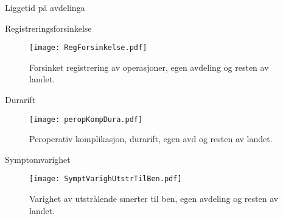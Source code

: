 \documentclass[handout, xcolor=pdftex,dvipsnames,table]{beamer}\usepackage[]{graphicx}\usepackage[]{color}
\begin{document}
\begin{tiny}
\begin{frame}[fragile] {Liggetid på avdelinga}
\end{frame}



\begin{frame}[fragile] {Registreringsforsinkelse}

\begin{figure}[ht]
\centering              
\texttt{[image: RegForsinkelse.pdf]}
\caption{Forsinket registrering av operasjoner, egen avdeling og resten av landet.}
\end{figure}

\end{frame}

\begin{frame}[fragile] {Durarift}
\begin{figure}[ht]
\centering              
\texttt{[image: peropKompDura.pdf]}
\caption{Peroperativ komplikasjon, durarift, egen avd og resten av landet.}
\end{figure}
\end{frame}

\begin{frame}[fragile] {Symptomvarighet}
\begin{figure}[ht]
\centering              
\texttt{[image: SymptVarighUtstrTilBen.pdf]}
\caption{Varighet av utstrålende smerter til ben, egen avdeling og resten av landet.}
\end{figure}
\end{frame}

\end{tiny}
\end{document}
